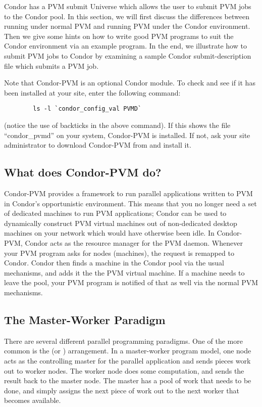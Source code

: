 
\newcommand{\func}[1]{\texttt{#1}}

Condor has a PVM submit Universe which allows the user to submit PVM jobs to
the Condor pool.  In this section, we will first
discuss the differences between running under normal PVM and running PVM under the Condor
environment.  Then we give some hints on how to write good PVM
programs to suit the Condor environment via an example program.  In the
end, we illustrate how to submit PVM jobs to Condor by examining a
sample Condor submit-description file which submits a PVM job.

Note that Condor-PVM is an optional Condor module.  To check and see if
it has been installed at your site, enter the following command:
\begin{verbatim}
        ls -l `condor_config_val PVMD`
\end{verbatim}
(notice the use of backticks in the above command).  If this shows the
file ``condor\_pvmd'' on your system, Condor-PVM is installed.  If not,
ask your site administrator to download Condor-PVM from
 and install it.

\subsection{What does Condor-PVM do?}

Condor-PVM provides a framework to run parallel applications written to
PVM in Condor's opportunistic environment.  This means that you no
longer need a
set of dedicated machines to run PVM applications; Condor can be used to dynamically 
construct PVM virtual machines out of non-dedicated desktop machines on your network
which would have otherwise been idle.   In Condor-PVM, Condor acts as the
resource manager for the PVM daemon.  Whenever your PVM program asks
for nodes (machines), the request is remapped to Condor.  Condor then
finds a machine in the Condor pool via the usual mechanisms, and adds it
the the PVM virtual machine.  If a machine needs to leave the pool, your
PVM program is notified of that as well via the normal PVM mechanisms.

\subsection{The Master-Worker Paradigm}

There are several different parallel programming paradigms.  One of the
more common is the  (or )
arrangement.  In a master-worker program model, one node acts as the
controlling master for the parallel application and sends pieces work out to worker nodes.  The
worker node does some computation, and sends the result back to the
master node.  The master has a pool of work that needs to be
done, and simply assigns the next piece of work out to the next worker
that becomes available.  

